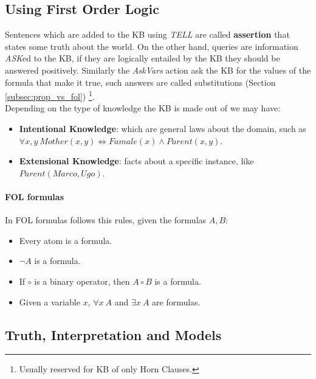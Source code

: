 \documentclass[10pt,a4paper]{article}
\begin{document}
\subsection{Using First Order Logic}
Sentences which are added to the KB using \textit{TELL} are called \textbf{assertion} that states some truth about the world. On the other hand, queries are information \textit{ASK}ed to the KB, if they are logically entailed by the KB they should be answered positively. Similarly the \textit{AskVars} action ask the KB for the values of the formula that make it true, such answers are called substitutions (Section \ref{subsec:prop_vs_fol}) \footnote{Usually reserved for KB of only Horn Clauses.}.\\
Depending on the type of knowledge the KB is made out of we may have:
 \begin{itemize}
\item \textbf{Intentional Knowledge}: which are general laws about the domain, such as $\forall x,y\  Mother(x,y) \Leftrightarrow Famale(x)\wedge Parent(x,y)$.
\item \textbf{Extensional Knowledge}: facts about a specific instance, like $Parent(Marco,Ugo)$. 
 \end{itemize}

\paragraph{FOL formulas}
In FOL formulas follows this rules, given the formulas $A,B$:
\begin{itemize}
\item Every atom is a formula.
\item $\neg A$ is a formula.
\item If $\circ$ is a binary operator, then $A\circ B$ is a formula.
\item Given a variable $x$, $\forall x\ A$ and $\exists x\ A$ are formulas.
\end{itemize}

\subsection{Truth, Interpretation and Models}

\newcommand{\satisfy}{\textcolor{red}{\models}} 
\newcommand{\nsatisfy}{\textcolor{red}{\nvDash}} 
\end{document}
